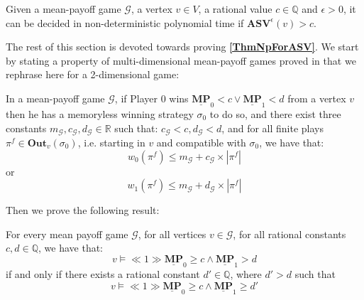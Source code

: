 \begin{theorem}
    \label{ThmNpForASV}
    Given a mean-payoff game $\mathcal{G}$, a vertex $v \in V$, a rational value $c \in \mathbb{Q}$ and $\epsilon > 0$, it can be decided in non-deterministic polynomial time if $\mathbf{ASV}^{\epsilon}(v) > c$.
\end{theorem}

\noindent The rest of this section is devoted towards proving \textbf{\cref{ThmNpForASV}}. We start by stating a property of multi-dimensional mean-payoff games proved in \cite{VCDHRR15} that we rephrase here for a 2-dimensional game:

\begin{lemma}
    \label{LemWeightPlayGrtThanC}
    In a mean-payoff game $\mathcal{G}$, if Player 0 wins $\underline{\mathbf{MP}}_0 < c \lor \underline{\mathbf{MP}}_1 < d$ from a vertex $v$ then he has a memoryless winning strategy $\sigma_0$ to do so, and there exist three constants $m_\mathcal{G}, c_\mathcal{G}, d_\mathcal{G} \in \mathbb{R}$ such that: $c_\mathcal{G} < c, d_\mathcal{G} < d$, and for all finite plays $\pi^f \in \mathbf{Out}_v(\sigma_0)$, i.e. starting in $v$ and compatible with $\sigma_0$, we have that:
    \begin{equation*}
        w_0(\pi^f) \leqslant m_\mathcal{G} + c_\mathcal{G} \times |\pi^f|
    \end{equation*}
    or
    \begin{equation*}
        w_1(\pi^f) \leqslant m_\mathcal{G} + d_\mathcal{G} \times |\pi^f|
    \end{equation*}
\end{lemma}

\noindent Then we prove the following result:

\begin{lemma}
    \label{ConjGrtIsGrtEq}
    For every mean payoff game $\mathcal{G}$, for all vertices $v \in \mathcal{G}$, for all rational constants $c, d \in \mathbb{Q}$, we have that:
    \begin{equation*}
        v \models \ll 1 \gg \underline{\mathbf{MP}}_0 \geqslant c \land \underline{\mathbf{MP}}_1 > d
    \end{equation*}
    if and only if there exists a rational constant $d' \in \mathbb{Q}$, where $d' > d$ such that
    \begin{equation*}
        v \models \ll 1 \gg \underline{\mathbf{MP}}_0 \geqslant c \land \underline{\mathbf{MP}}_1 \geqslant d'
    \end{equation*}
\end{lemma}

